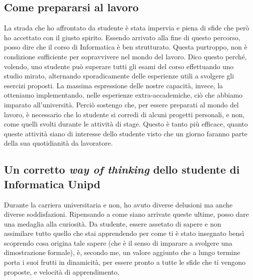 \subsection{Come prepararsi al lavoro}
La strada che ho affrontato da studente è stata impervia e piena di sfide che però ho accettato con il giusto spirito.
Essendo arrivato alla fine di questo percorso, posso dire che il corso di Informatica è ben strutturato. Questa purtroppo, non è condizione sufficiente per sopravvivere nel mondo del lavoro. Dico questo perché, volendo, uno studente può superare tutti gli esami del corso effettuando uno studio mirato, alternando sporadicamente delle esperienze utili a svolgere gli esercizi proposti. La massima espressione delle nostre capacità, invece, la otteniamo implementando, nelle esperienze extra-accademiche, ciò che abbiamo imparato all'università. Perciò sostengo che, per essere preparati al mondo del lavoro, è necessario che lo studente si corredi di alcuni progetti personali, e non, come quelli svolti durante le attività di stage. Questo è tanto più efficace, quanto queste attività siano di interesse dello studente visto che un giorno faranno parte della sua quotidianità da lavoratore.
\subsection{Un corretto \textit{way of thinking} dello studente di Informatica Unipd}
Durante la carriera universitaria e non, ho avuto diverse delusioni ma anche diverse soddisfazioni. Ripensando a come siano arrivate queste ultime, posso dare una medaglia alla curiosità.
Da studente, essere assetato di sapere e non assimilare tutto quello che stai apprendendo per come ti è stato insegnato bensì scoprendo cosa origina tale sapere (che è il senso di imparare a svolgere una dimostrazione formale), è, secondo me, un valore aggiunto che a lungo termine porta i suoi frutti in dinamicità, per essere pronto a tutte le sfide che ti vengono proposte, e velocità di apprendimento.
